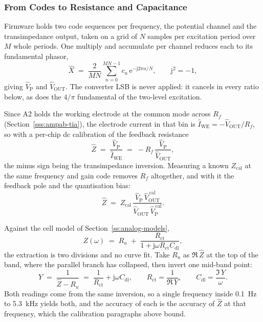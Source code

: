 \subsubsection{From Codes to Resistance and Capacitance}\label{sss:eis-firmware}

Firmware holds two code sequences per frequency, the potential channel and the
transimpedance output, taken on a grid of \(N\) samples per excitation period
over \(M\) whole periods. One multiply and accumulate per channel reduces each
to its fundamental phasor,
\begin{equation}\label{eq:eis-demod}
  \hat{X} \;=\; \frac{2}{MN}\sum_{n=0}^{MN-1} c_n\,
                \mathrm{e}^{-\mathrm{j}2\pi n/N},
  \qquad \mathrm{j}^2 = -1,
\end{equation}
giving \(\hat{V}_{\mathrm{P}}\) and \(\hat{V}_{\mathrm{OUT}}\). The converter LSB
is never applied: it cancels in every ratio below, as does the \(4/\pi\)
fundamental of the two-level excitation.

Since A2 holds the working electrode at the common mode across \(R_f\)
(Section~\ref{sss:ampab-tia}), the electrode current in that bin is
\(\hat{I}_{\mathrm{WE}} = -\hat{V}_{\mathrm{OUT}}/R_f\), so with a per-chip dc
calibration of the feedback resistance
\begin{equation}\label{eq:eis-z-rf}
  \hat{Z} \;=\; \frac{\hat{V}_{\mathrm{P}}}{\hat{I}_{\mathrm{WE}}}
          \;=\; -R_f\,\frac{\hat{V}_{\mathrm{P}}}{\hat{V}_{\mathrm{OUT}}},
\end{equation}
the minus sign being the transimpedance inversion. Measuring a known
\(Z_{\mathrm{cal}}\) at the same frequency and gain code removes \(R_f\)
altogether, and with it the feedback pole and the quantisation bias:
\begin{equation}\label{eq:eis-z-ratio}
  \hat{Z} \;=\; Z_{\mathrm{cal}}\,
    \frac{\hat{V}_{\mathrm{P}}\,\hat{V}^{\,\mathrm{cal}}_{\mathrm{OUT}}}
         {\hat{V}_{\mathrm{OUT}}\,\hat{V}^{\,\mathrm{cal}}_{\mathrm{P}}}.
\end{equation}

Against the cell model of Section~\ref{ss:analog-models},
\begin{equation}\label{eq:eis-cell}
  Z(\omega) \;=\; R_u \;+\; \frac{R_{\mathrm{ct}}}
                                 {1 + \mathrm{j}\omega R_{\mathrm{ct}} C_{\mathrm{dl}}},
\end{equation}
the extraction is two divisions and no curve fit. Take \(R_u\) as
\(\Re\,\hat{Z}\) at the top of the band, where the parallel branch has
collapsed, then invert one mid-band point:
\begin{equation}\label{eq:eis-extract}
  Y \;=\; \frac{1}{\hat{Z} - R_u}
    \;=\; \frac{1}{R_{\mathrm{ct}}} + \mathrm{j}\omega C_{\mathrm{dl}},
  \qquad
  R_{\mathrm{ct}} = \frac{1}{\Re\,Y},
  \qquad
  C_{\mathrm{dl}} = \frac{\Im\,Y}{\omega}.
\end{equation}
Both readings come from the same inversion, so a single frequency inside
\SI{0.1}{\hertz} to \SI{5.3}{\kilo\hertz} yields both, and the accuracy of each
is the accuracy of \(\hat{Z}\) at that frequency, which the calibration paragraphs above bound.

